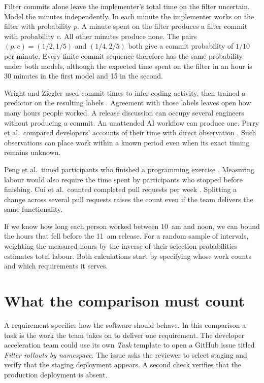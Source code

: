 \documentclass[12pt,a4paper]{amsart}
\begin{document}
Filter commits alone leave the implementer's total time on the filter uncertain. Model the minutes independently. In each minute the implementer works on the filter with probability $p$. A minute spent on the filter produces a filter commit with probability $c$. All other minutes produce none. The pairs $(p,c)=(1/2,1/5)$ and $(1/4,2/5)$ both give a commit probability of $1/10$ per minute. Every finite commit sequence therefore has the same probability under both models, although the expected time spent on the filter in an hour is 30 minutes in the first model and 15 in the second.

Wright and Ziegler used commit times to infer coding activity, then trained a predictor on the resulting labels \cite{wright2019}. Agreement with those labels leaves open how many hours people worked. A release discussion can occupy several engineers without producing a commit. An unattended AI workflow can produce one. Perry et al.\ compared developers' accounts of their time with direct observation \cite{perry1994}. Such observations can place work within a known period even when its exact timing remains unknown.

Peng et al.\ timed participants who finished a programming exercise \cite{peng2023}. Measuring labour would also require the time spent by participants who stopped before finishing. Cui et al.\ counted completed pull requests per week \cite{cui2026}. Splitting a change across several pull requests raises the count even if the team delivers the same functionality.

If we know how long each person worked between 10~am and noon, we can bound the hours that fell before the 11~am release. For a random sample of intervals, weighting the measured hours by the inverse of their selection probabilities estimates total labour. Both calculations start by specifying whose work counts and which requirements it serves.

\section{What the comparison must count}
\label{sec:accounting}

A requirement specifies how the software should behave. In this comparison a task is the work the team takes on to deliver one requirement. The developer acceleration team could use its own \emph{Task} template to open a GitHub issue titled \emph{Filter rollouts by namespace}. The issue asks the reviewer to select staging and verify that the staging deployment appears. A second check verifies that the production deployment is absent.
\end{document}

